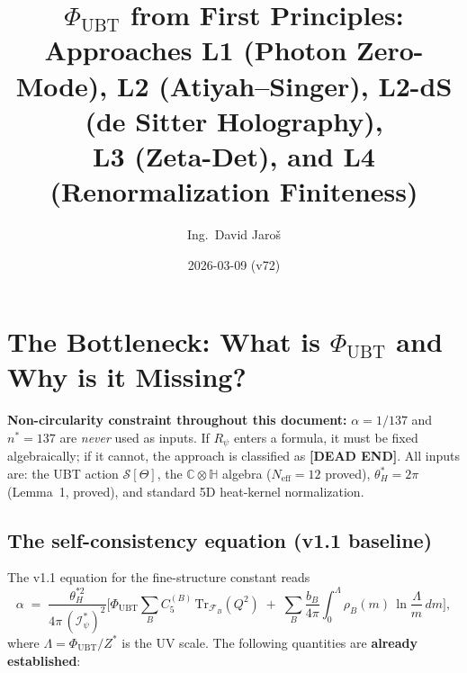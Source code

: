 \documentclass[11pt,a4paper]{article}
\title{$\Phi_{\mathrm{UBT}}$ from First Principles:\\
    \large Approaches L1 (Photon Zero-Mode),
    L2 (Atiyah--Singer), L2-dS (de Sitter Holography),\\
    L3 (Zeta-Det), and L4 (Renormalization Finiteness)}
\author{Ing.\ David Jaroš}
\date{2026-03-09 (v72)}
\theoremstyle{definition}
\theoremstyle{remark}
\begin{document}
  \maketitle
\fi

\section{The Bottleneck: What is $\Phi_{\mathrm{UBT}}$ and Why is it Missing?}
\label{sec:phi_ubt_bottleneck}

\textbf{Non-circularity constraint throughout this document:}
$\alpha = 1/137$ and $n^* = 137$ are \emph{never} used as inputs.
If $R_\psi$ enters a formula, it must be fixed algebraically; if it cannot,
the approach is classified as \textbf{[DEAD END]}.
All inputs are: the UBT action $\mathcal{S}[\Theta]$,
the $\mathbb{C}\otimes\mathbb{H}$ algebra ($N_{\mathrm{eff}}=12$ proved),
$\theta_H^* = 2\pi$ (Lemma~1, proved), and standard 5D heat-kernel normalization.

\subsection{The self-consistency equation (v1.1 baseline)}

The v1.1 equation for the fine-structure constant reads
\begin{equation}
  \label{eq:alpha_sc}
  \alpha \;=\;
  \frac{\theta_H^{*2}}{4\pi\,(\mathcal{I}_\psi^*)^2}
  \Bigg[
    \Phi_{\mathrm{UBT}}\sum_B C_5^{(B)}\,\mathrm{Tr}_{\mathcal{F}_B}(Q^2)
    \;+\;
    \sum_B \frac{b_B}{4\pi}
      \int_0^{\Lambda}\!\rho_B(m)\,
      \ln\!\frac{\Lambda}{m}\,dm
  \Bigg],
\end{equation}
where $\Lambda = \Phi_{\mathrm{UBT}}/Z^*$ is the UV scale.
The following quantities are \textbf{already established}:
\end{document}

